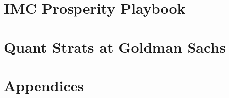 \documentclass[11pt, openany, a4paper, oneside]{memoir}
\begin{document}
\part{IMC Prosperity Playbook}





\part{Quant Strats at Goldman Sachs}













\appendix
\part{Appendices}




\backmatter




\printindex
\end{document}
